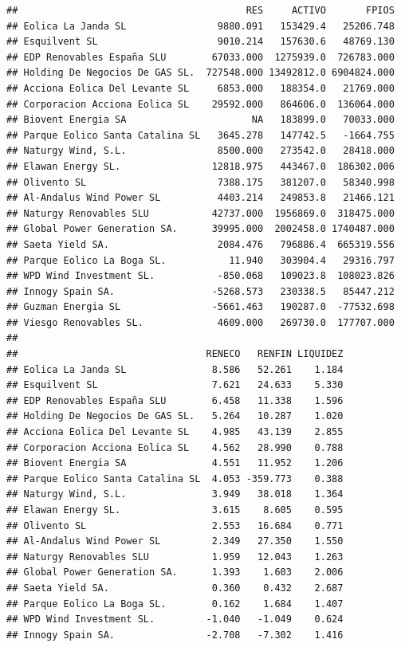 \documentclass[
]{book}
\begin{document}
\begin{verbatim}
##                                        RES     ACTIVO       FPIOS
## Eolica La Janda SL                9880.091   153429.4   25206.748
## Esquilvent SL                     9010.214   157630.6   48769.130
## EDP Renovables España SLU        67033.000  1275939.0  726783.000
## Holding De Negocios De GAS SL.  727548.000 13492812.0 6904824.000
## Acciona Eolica Del Levante SL     6853.000   188354.0   21769.000
## Corporacion Acciona Eolica SL    29592.000   864606.0  136064.000
## Biovent Energia SA                      NA   183899.0   70033.000
## Parque Eolico Santa Catalina SL   3645.278   147742.5   -1664.755
## Naturgy Wind, S.L.                8500.000   273542.0   28418.000
## Elawan Energy SL.                12818.975   443467.0  186302.006
## Olivento SL                       7388.175   381207.0   58340.998
## Al-Andalus Wind Power SL          4403.214   249853.8   21466.121
## Naturgy Renovables SLU           42737.000  1956869.0  318475.000
## Global Power Generation SA.      39995.000  2002458.0 1740487.000
## Saeta Yield SA.                   2084.476   796886.4  665319.556
## Parque Eolico La Boga SL.           11.940   303904.4   29316.797
## WPD Wind Investment SL.           -850.068   109023.8  108023.826
## Innogy Spain SA.                 -5268.573   230338.5   85447.212
## Guzman Energia SL                -5661.463   190287.0  -77532.698
## Viesgo Renovables SL.             4609.000   269730.0  177707.000
## 
##                                 RENECO   RENFIN LIQUIDEZ
## Eolica La Janda SL               8.586   52.261    1.184
## Esquilvent SL                    7.621   24.633    5.330
## EDP Renovables España SLU        6.458   11.338    1.596
## Holding De Negocios De GAS SL.   5.264   10.287    1.020
## Acciona Eolica Del Levante SL    4.985   43.139    2.855
## Corporacion Acciona Eolica SL    4.562   28.990    0.788
## Biovent Energia SA               4.551   11.952    1.206
## Parque Eolico Santa Catalina SL  4.053 -359.773    0.388
## Naturgy Wind, S.L.               3.949   38.018    1.364
## Elawan Energy SL.                3.615    8.605    0.595
## Olivento SL                      2.553   16.684    0.771
## Al-Andalus Wind Power SL         2.349   27.350    1.550
## Naturgy Renovables SLU           1.959   12.043    1.263
## Global Power Generation SA.      1.393    1.603    2.006
## Saeta Yield SA.                  0.360    0.432    2.687
## Parque Eolico La Boga SL.        0.162    1.684    1.407
## WPD Wind Investment SL.         -1.040   -1.049    0.624
## Innogy Spain SA.                -2.708   -7.302    1.416

\end{verbatim}
\end{document}
